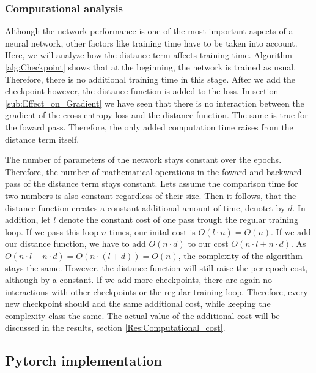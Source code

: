 \subsubsection{Computational analysis}\label{sub:Computational_Analysis}
Although the network performance is one of the most important aspects of a
neural network, other factors like training time have to be taken into account.
Here, we will analyze how the distance term affects training time. Algorithm
\ref{alg:Checkpoint} shows that at the beginning, the network is trained as
usual. Therefore, there is no additional training time in this stage. After we
add the checkpoint however, the distance function is added to the loss. In
section \ref{sub:Effect_on_Gradient} we have seen that there is no interaction
between the gradient of the cross-entropy-loss and the distance function. The
same is true for the foward pass. Therefore, the only added computation time
raises from the distance term itself.

The number of parameters of the network stays constant over the epochs.
Therefore, the number of mathematical operations in the foward and backward pass
of the distance term stays constant. Lets assume the comparison time for two
numbers is also constant regardless of their size. Then it follows, that the
distance function creates a constant additional amount of time, denotet by $d$.
In addition, let $l$ denote the constant cost of one pass trough the regular
training loop. If we pass this loop $n$ times, our inital cost is $O(l\cdot
n)=O(n)$. If we add our distance function, we have to add $O(n\cdot d)$ to our
cost $O(n\cdot l + n \cdot d)$. As $O(n\cdot l + n \cdot d)=O(n\cdot (l +
d))=O(n)$, the complexity of the algorithm stays the same. However, the distance
function will still raise the per epoch cost, although by a constant. If we add
more checkpoints, there are again no interactions with other checkpoints or the
regular training loop. Therefore, every new checkpoint should add the same
additional cost, while keeping the complexity class the same. The actual value
of the additional cost will be discussed in the results, section
\ref{Res:Computational_cost}.


\subsection{Pytorch implementation}

